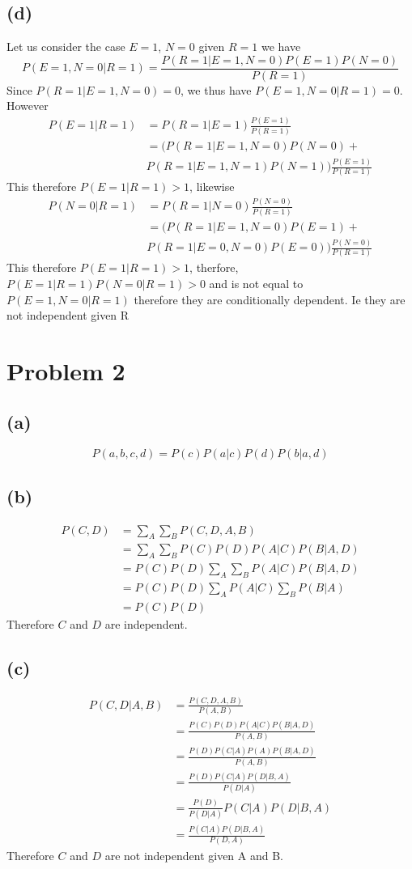 \documentclass[12pt]{article}
\begin{document}
\subsection*{(d)}
Let us consider the case $E=1$, $N=0$ given $R=1$ we have
$$P(E=1,N=0|R=1)=\frac{P(R=1|E=1,N=0)P(E=1)P(N=0)}{P(R=1)}$$
Since $P(R=1|E=1,N=0)=0$, we thus have $P(E=1,N=0|R=1)=0$. However 
\begin{align*}
    P(E=1|R=1)&=P(R=1|E=1)\frac{P(E=1)}{P(R=1)}\\
    &=(P(R=1|E=1,N=0)P(N=0)+\\
    &P(R=1|E=1,N=1)P(N=1))\frac{P(E=1)}{P(R=1)}
\end{align*}
This therefore $P(E=1|R=1)>1$, likewise
\begin{align*}
    P(N=0|R=1)&=P(R=1|N=0)\frac{P(N=0)}{P(R=1)}\\
    &=(P(R=1|E=1,N=0)P(E=1)+\\
    &P(R=1|E=0,N=0)P(E=0))\frac{P(N=0)}{P(R=1)}
\end{align*}
This therefore $P(E=1|R=1)>1$, therfore, $P(E=1|R=1)P(N=0|R=1)>0$ and is not equal to $P(E=1,N=0|R=1)$ therefore they are conditionally dependent.
Ie they are not independent given R
\section*{Problem 2}
\subsection*{(a)}
$$\boxed{P(a,b,c,d)=P(c)P(a|c)P(d)P(b|a,d)}$$
\subsection*{(b)}
\begin{align*}
    P(C,D)&=\sum_{A}\sum_{B}P(C,D,A,B)\\
    &=\sum_{A}\sum_{B}P(C)P(D)P(A|C)P(B|A,D)\\
    &=P(C)P(D)\sum_{A}\sum_{B}P(A|C)P(B|A,D)\\
    &=P(C)P(D)\sum_{A}P(A|C)\sum_{B}P(B|A)\\
    &=P(C)P(D)
\end{align*}
Therefore $C$ and $D$ are independent.
\subsection*{(c)}
\begin{align*}
    P(C,D|A,B)&=\frac{P(C,D,A,B)}{P(A,B)}\\
    &=\frac{P(C)P(D)P(A|C)P(B|A,D)}{P(A,B)}\\
    &=\frac{P(D)P(C|A)P(A)P(B|A,D)}{P(A,B)}\\
    &=\frac{P(D)P(C|A)P(D|B,A)}{P(D|A)}\\
    &=\frac{P(D)}{P(D|A)}P(C|A)P(D|B,A)\\
    &=\frac{P(C|A)P(D|B,A)}{P(D,A)}
\end{align*}
Therefore $C$ and $D$ are not independent given A and B.
\end{document}
